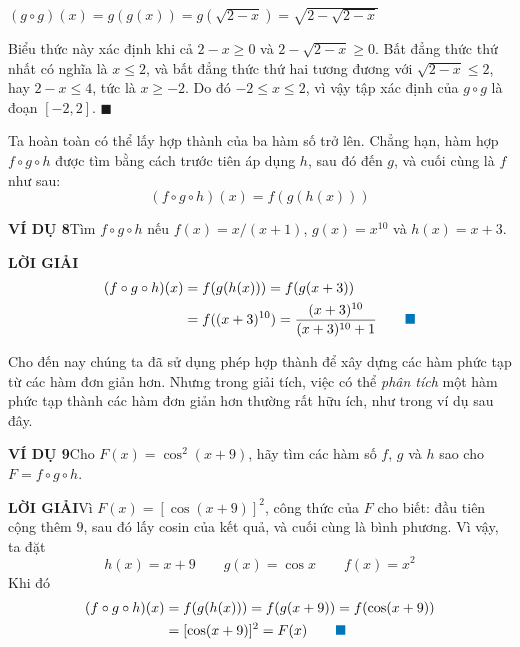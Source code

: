 \enlargethispage{20pt}
\noindent
\parbox[t]{\linewidth}{%
  \centering $(g \circ g)(x) = g(g(x)) = g(\sqrt{2 - x}) = \sqrt{2 - \sqrt{2 - x}}$%
}

\vspace{0.5em}
\noindent
Biểu thức này xác định khi cả $2 - x \geqslant 0$ và $2 - \sqrt{2 - x} \geqslant 0$. Bất đẳng thức thứ nhất có nghĩa là $x \leqslant 2$, và bất đẳng thức thứ hai tương đương với $\sqrt{2 - x} \leqslant 2$, hay $2 - x \leqslant 4$, tức là $x \geqslant -2$. Do đó $-2 \leqslant x \leqslant 2$, vì vậy tập xác định của $g \circ g$ là đoạn $[-2, 2]$. \hfill{\color{stewartcyan}$\blacksquare$}

\vspace{0.8em}
\noindent
Ta hoàn toàn có thể lấy hợp thành của ba hàm số trở lên. Chẳng hạn, hàm hợp $f \circ g \circ h$ được tìm bằng cách trước tiên áp dụng $h$, sau đó đến $g$, và cuối cùng là $f$ như sau:
\[
(f \circ g \circ h)(x) = f(g(h(x)))
\]

\vspace{0.5em}
\noindent
\textbf{\textsf{\color{stewartcyan}VÍ DỤ 8}}\quad Tìm $f \circ g \circ h$ nếu $f(x) = x/(x + 1)$, $g(x) = x^{10}$ và $h(x) = x + 3$.

\vspace{0.3em}
\noindent
\textbf{\textsf{\color{stewartcyan}LỜI GIẢI}}
\begin{align*}
(f \circ g \circ h)(x) &= f(g(h(x))) = f(g(x + 3)) \\
&= f((x + 3)^{10}) = \frac{(x + 3)^{10}}{(x + 3)^{10} + 1} \tag*{\color{stewartcyan}$\blacksquare$}
\end{align*}

\vspace{0.5em}
\noindent
Cho đến nay chúng ta đã sử dụng phép hợp thành để xây dựng các hàm phức tạp từ các hàm đơn giản hơn. Nhưng trong giải tích, việc có thể \emph{phân tích} một hàm phức tạp thành các hàm đơn giản hơn thường rất hữu ích, như trong ví dụ sau đây.

\vspace{0.8em}
\noindent
\textbf{\textsf{\color{stewartcyan}VÍ DỤ 9}}\quad Cho $F(x) = \cos^2(x + 9)$, hãy tìm các hàm số $f$, $g$ và $h$ sao cho $F = f \circ g \circ h$.

\vspace{0.3em}
\noindent
\textbf{\textsf{\color{stewartcyan}LỜI GIẢI}}\quad Vì $F(x) = [\cos(x + 9)]^2$, công thức của $F$ cho biết: đầu tiên cộng thêm $9$, sau đó lấy cosin của kết quả, và cuối cùng là bình phương. Vì vậy, ta đặt
\[
h(x) = x + 9 \qquad g(x) = \cos x \qquad f(x) = x^2
\]
Khi đó
\begin{align*}
(f \circ g \circ h)(x) &= f(g(h(x))) = f(g(x + 9)) = f(\cos(x + 9)) \\
&= [\cos(x + 9)]^2 = F(x) \tag*{\color{stewartcyan}$\blacksquare$}
\end{align*}

